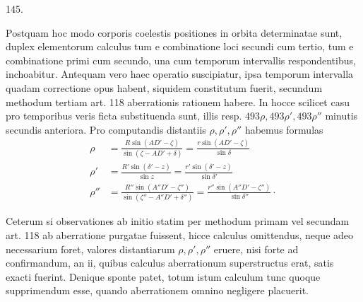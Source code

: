 \par{}\medskip
{}\begin{center}\hypertarget{native-196-article145}{}145.\end{center}
Postquam hoc modo corporis coelestis positiones in orbita determinatae sunt,
duplex elementorum calculus tum e combinatione loci secundi cum tertio,
tum e combinatione primi cum secundo, una cum temporum intervallis respondentibus,
inchoabitur. Antequam vero haec operatio suscipiatur, ipsa temporum
intervalla quadam correctione opus habent, siquidem constitutum fuerit,
secundum methodum tertiam art. 118 aberrationis rationem habere. In hocce
scilicet casu pro temporibus veris ficta substituenda sunt, illis resp. $493\rho,493\rho',493\rho''$
minutis secundis anteriora. Pro computandis distantiis $\rho,\rho',\rho''$ habemus
formulas
\[
\begin{aligned}
\rho&=\frac{R\sin(AD'-\zeta)}{\sin(\zeta-AD'+\delta)}=\frac{r\sin(AD'-\zeta)}{\sin\delta}\\[3pt]
\rho'&=\frac{R'\sin(\delta'-z)}{\sin z}=\frac{r'\sin(\delta'-z)}{\sin\delta'}\\[3pt]
\rho''&=\frac{R''\sin(A''D'-\zeta'')}{\sin(\zeta''-A''D'+\delta'')}=\frac{r''\sin(A''D'-\zeta'')}{\sin\delta''}\mathpunct{\cdot}
\end{aligned}
\]

Ceterum si observationes ab initio statim per methodum primam vel secundam
art. 118 ab aberratione purgatae fuissent, hicce calculus omittendus,
neque adeo necessarium foret, valores distantiarum $\rho,\rho',\rho''$ eruere, nisi forte
ad confirmandum, an ii, quibus calculus aberrationum superstructus erat, satis
exacti fuerint. Denique sponte patet, totum istum calculum tunc quoque supprimendum
esse, quando aberrationem omnino negligere placuerit.

